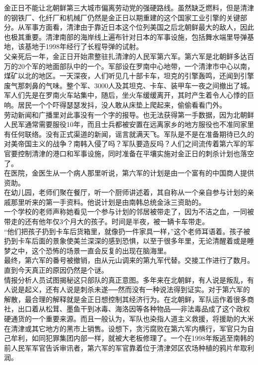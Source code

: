 金正日不能让北朝鲜第三大城市偏离劳动党的强硬路线。虽然缺乏燃料，但是清津的钢铁厂、化纤厂和机械厂仍然是金正日以期重建的这个国家工业引擎的关键部分。从军事方面看，清津由于靠近日本这个位列美国之后北朝鲜最大的敌人，因此也极其重要。清津南部的海岸线上遍布针对日本的军事设施，包括舞水端里导弹基地，该基地于1998年经行了长程导弹的试射。\\

父亲死后一年，金正日开始肃整驻扎清津的人民军第六军。第六军是北朝鲜多达百万的20个军的地面部队中的一个。军部设在罗南中心地带，一个清津市中心以南，煤矿以北的地区。一天深夜，人们听见几十部卡车，坦克的引擎轰鸣，还闻到引擎废气那刺鼻的气味。整个军、3000人及其坦克、卡车、装甲车一夜之间撤出了城。军人们先是在罗南火车站集中，随后，坐火车缓缓离开，其时产生着令人心悸的巨响。居民一个个吓得瑟瑟发抖，没人敢从床垫上爬起来，偷偷看看门外。\\

劳动新闻和广播里对此事没有一个字的报导。也无法获得第一手数据，因为北朝鲜人民军通常需要服役10年，而且士兵都被安置在远离家乡的地方服役也不准同家里有任何联络。没有正式渠道的新闻，谣言就满天飞。军队是不是在准备期待已久的对美帝国主义的战争？南韩入侵了吗？军队要造反吗？人们之间流传着第六军的军官要控制清津的港口和军事设施，同时准备在平壤实施对金正日的刺杀计划也落空了。\\

在医院，金医生从一个病人那里听说，第六军的计划是由一个富有的中国商人提供资助。\\

在幼儿园，老师们聚在餐厅，听一个厨师讲述着，其自称从一个亲自参与计划的亲戚那里听来的第一手资料。他说计划是由南韩总统金泳三资助的。\\

一个学校的老师声称她看见一个参与计划的邻居被带走了，因为不洁之血，一同被带走的还有他年仅3个月大的孩子。时间是半夜，被一辆卡车带走。\\

“他们把孩子扔到卡车后货箱里，就像扔一件家具一样，”这个老师耳语着。孩子被扔到卡车后面的景象使美兰深深的感到恐惧，以至于很多年里，无论清醒着或是睡梦之中，这个恐怖的场景一直会反复的出现在脑海里。\\

最终，第六军的番号被撤销，由从元山调来的第九军代替。交接工作进行了数月。直到今天真正的原因仍然是个谜。\\

情报分析人员试图揭秘这只部队的真正意图。多年来在北朝鲜，有人说是叛乱，有人说是起义，还有人说是刺杀未遂──然而没有一种说法得到证实。对于第六军的解散，最合理的解释就是金正日想控制其经济行为。在北朝鲜，军队运作着很多商社，出口着从松茸、墨鱼干到冰毒、海洛因等各种物品──非法毒品成了这个政权硬通货的一个重要来源。而且一般认为，军队也染指人道主义救援，将援助的大米在清津或其它地方的黑市上销售。设想下，贪污腐败在第六军内横行，军官只为自己牟利，如同犯罪集团内部一样，就被大老板修理了。一个在1998年叛逃至南韩的前人民军军官告诉审讯者，第六军的军官靠着位于清津郊区农场种植的鸦片牟取利润。\\

